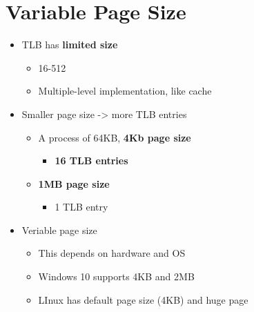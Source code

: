 \documentclass[a4paper,11pt,english]{article}
\begin{document}
\section*{Variable Page Size}
\begin{itemize}
    \item TLB has \textbf{\color{blue} limited size}
        \begin{itemize}
            \item 16-512
            \item Multiple-level implementation, like cache
        \end{itemize}
    \item Smaller page size -> more TLB entries
        \begin{itemize}
            \item A process of 64KB, \textbf{\color{blue} 4Kb page size}
                \begin{itemize}
                    \item \textbf{16 TLB entries}
                \end{itemize}
            \item \textbf{\color{blue} 1MB page size}
                \begin{itemize}
                    \item 1 TLB entry
                \end{itemize}
        \end{itemize}
    \item Veriable page size
        \begin{itemize}
            \item This depends on hardware and OS
            \item Windows 10 supports 4KB and 2MB
            \item LInux has default page size (4KB) and huge page
        \end{itemize}
\end{itemize}
\end{document}
